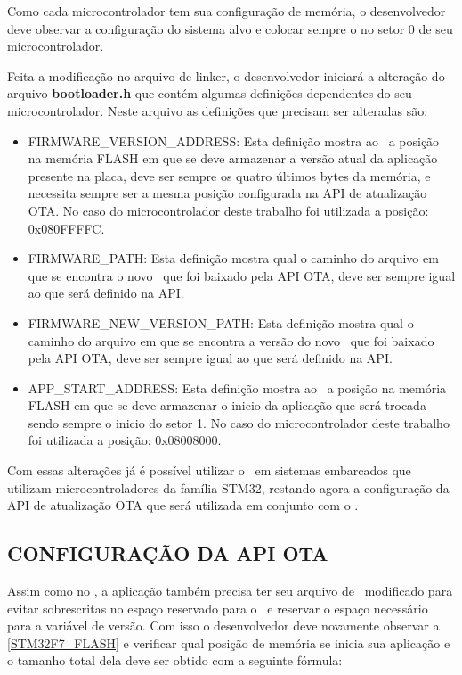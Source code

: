 Como cada microcontrolador tem sua configuração de memória, o desenvolvedor deve observar a configuração do sistema alvo e colocar sempre o \bootloader no setor 0 de seu microcontrolador.

Feita a modificação no arquivo de linker, o desenvolvedor iniciará a alteração do arquivo \textbf{bootloader.h} que contém algumas definições dependentes do seu microcontrolador. Neste arquivo as definições que precisam ser alteradas são:
\begin{itemize}
    \item FIRMWARE\_VERSION\_ADDRESS: Esta definição mostra ao \bootloader\ a posição na memória FLASH em que se deve armazenar a versão atual da aplicação presente na placa, deve ser sempre os quatro últimos bytes da memória, e necessita sempre ser a mesma posição configurada na API de atualização OTA. No caso do microcontrolador deste trabalho foi utilizada a posição: 0x080FFFFC.
    \item FIRMWARE\_PATH: Esta definição mostra qual o caminho do arquivo em que se encontra o novo \firmware\ que foi baixado pela API OTA, deve ser sempre igual ao que será definido na API.
    \item FIRMWARE\_NEW\_VERSION\_PATH: Esta definição mostra qual o caminho do arquivo em que se encontra a versão do novo \firmware\ que foi baixado pela API OTA, deve ser sempre igual ao que será definido na API.
    \item APP\_START\_ADDRESS: Esta definição mostra ao \bootloader\ a posição na memória FLASH em que se deve armazenar o inicio da aplicação que será trocada sendo sempre o inicio do setor 1. No caso do microcontrolador deste trabalho foi utilizada a posição: 0x08008000.
   
\end{itemize}

Com essas alterações já é possível utilizar o \bootloader\ em sistemas embarcados que utilizam microcontroladores da família STM32, restando agora a configuração da API de atualização OTA que será utilizada em conjunto com o \bootloader.

\subsection{CONFIGURAÇÃO DA API OTA}
Assim como no \bootloader, a aplicação também precisa ter seu arquivo de \linker\ modificado para evitar sobrescritas no espaço reservado para o \bootloader\ e reservar o espaço necessário para a variável de versão. Com isso o desenvolvedor deve novamente observar a \autoref{STM32F7_FLASH} e verificar qual posição de memória se inicia sua aplicação e o tamanho total dela deve ser obtido com a seguinte fórmula:

